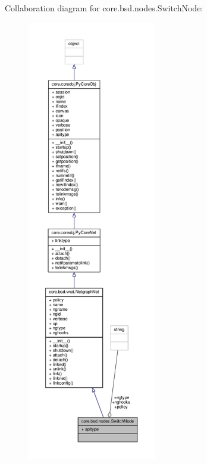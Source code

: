 Collaboration diagram for core.\+bsd.\+nodes.\+Switch\+Node\+:
\nopagebreak
\begin{figure}[H]
\begin{center}
\leavevmode
\includegraphics[height=550pt]{classcore_1_1bsd_1_1nodes_1_1_switch_node__coll__graph}
\end{center}
\end{figure}
